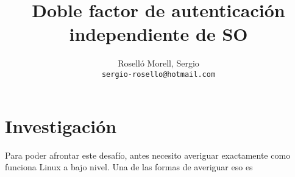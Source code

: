 \documentclass[titlepage]{article}
\title{Doble factor de autenticación independiente de SO}
\author{Roselló Morell, Sergio\\
\texttt{sergio-rosello@hotmail.com}}
\begin{document}
\maketitle
\tableofcontents
\clearpage

\section{Investigación}
\cite{codecoffee}
\cite{DBus}
Para poder afrontar este desafío, antes necesito averiguar exactamente como funciona Linux a bajo nivel. Una de las formas de averiguar eso es 
\printbibliography[heading=bibintoc,title={Bibliografía}]
\end{document}
